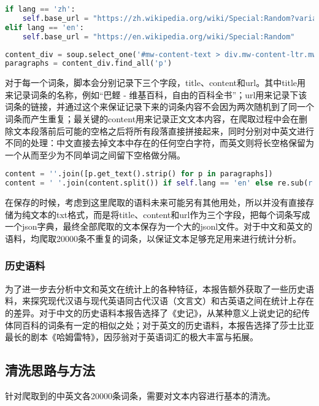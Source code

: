 \documentclass[11pt]{article}
\begin{document}
	\begin{lstlisting}[language=Python, label=code2.1]
if lang == 'zh':
	self.base_url = "https://zh.wikipedia.org/wiki/Special:Random?variant=zh-cn"    #加上zh-cn确保爬下来的是大陆简体中文
elif lang == 'en':
	self.base_url = "https://en.wikipedia.org/wiki/Special:Random"
	\end{lstlisting}
	
	\begin{lstlisting}[language=Python, label=code2.2]
content_div = soup.select_one('#mw-content-text > div.mw-content-ltr.mw-parser-output')	# 直接定位到该路径
paragraphs = content_div.find_all('p')
	\end{lstlisting}
	
	对于每一个词条，脚本会分别记录下三个字段，title、content和url。其中title用来记录词条的名称，例如“巴鲣 - 维基百科，自由的百科全书”；url用来记录下该词条的链接，并通过这个来保证记录下来的词条内容不会因为两次随机到了同一个词条而产生重复；最关键的content用来记录正文文本内容，在爬取过程中会在删除文本段落前后可能的空格之后将所有段落直接拼接起来，同时分别对中英文进行不同的处理：中文直接去掉文本中存在的任何空白字符，而英文则将长空格保留为一个从而至少为不同单词之间留下空格做分隔。
	
	\begin{lstlisting}[language=Python, label=code2.3]
content = ''.join([p.get_text().strip() for p in paragraphs]) 
content = ' '.join(content.split()) if self.lang == 'en' else re.sub(r'\s+', '', content)   # 分情况处理，英文需要用空格来分隔单词，中文直接可以把空白字符给去掉
	\end{lstlisting}
	
	在保存的时候，考虑到这里爬取的语料未来可能另有其他用处，所以并没有直接存储为纯文本的txt格式，而是将title、content和url作为三个字段，把每个词条写成一个json字典，最终全部爬取的文本保存为一个大的jsonl文件。对于中文和英文的语料，均爬取20000条不重复的词条，以保证文本足够充足用来进行统计分析。
	
	\subsubsection{历史语料}
	为了进一步去分析中文和英文在统计上的各种特征，本报告额外获取了一些历史语料，来探究现代汉语与现代英语同古代汉语（文言文）和古英语之间在统计上存在的差异。对于中文的历史语料本报告选择了《史记》，从某种意义上说史记的纪传体同百科的词条有一定的相似之处；对于英文的历史语料，本报告选择了莎士比亚最长的剧本《哈姆雷特》，因莎翁对于英语词汇的极大丰富与拓展。

	\subsection{清洗思路与方法}
	针对爬取到的中英文各20000条词条，需要对文本内容进行基本的清洗。
\end{document}
